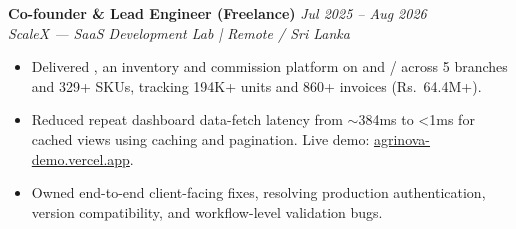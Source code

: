 \noindent
\textbf{Co-founder \& Lead Engineer (Freelance)} \hfill \textit{Jul 2025 -- Aug 2026}\\
\noindent
\textit{ScaleX --- SaaS Development Lab | Remote / Sri Lanka}\\[0.05em]

\begin{itemize}[leftmargin=*, itemsep=0.3em, topsep=0.01em]
  \item Delivered , an inventory and commission platform on  and /\allowbreak{} across 5 branches and 329+ SKUs, tracking 194K+ units and 860+ invoices (Rs.~64.4M+).
  \item Reduced repeat dashboard data-fetch latency from $\sim$384ms to <1ms for cached views using  caching and pagination. Live demo: \href{https://agrinova-demo.vercel.app/}{agrinova-demo.vercel.app}.
  \item Owned end-to-end client-facing fixes, resolving production authentication, version compatibility, and workflow-level validation bugs.
\end{itemize}
